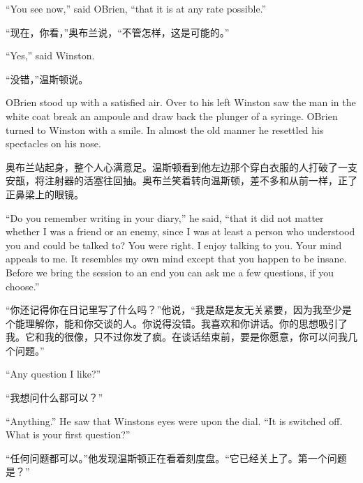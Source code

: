 \begin{paracol}{2}
\switchcolumn*

``You see now,'' said O\textquotesingle Brien, ``that it is at any rate
possible.''

\switchcolumn

``现在，你看，''奥布兰说，``不管怎样，这是可能的。''

\switchcolumn*

``Yes,'' said Winston.

\switchcolumn

``没错，''温斯顿说。

\switchcolumn*

O\textquotesingle Brien stood up with a satisfied air. Over to his left
Winston saw the man in the white coat break an ampoule and draw back the
plunger of a syringe. O\textquotesingle Brien turned to Winston with a
smile. In almost the old manner he resettled his spectacles on his nose.

\switchcolumn

奥布兰站起身，整个人心满意足。温斯顿看到他左边那个穿白衣服的人打破了一支安瓿，将注射器的活塞往回抽。奥布兰笑着转向温斯顿，差不多和从前一样，正了正鼻梁上的眼镜。

\switchcolumn*

``Do you remember writing in your diary,'' he said, ``that it did not
matter whether I was a friend or an enemy, since I was at least a person
who understood you and could be talked to? You were right. I enjoy
talking to you. Your mind appeals to me. It resembles my own mind except
that you happen to be insane. Before we bring the session to an end you
can ask me a few questions, if you choose.''

\switchcolumn

``你还记得你在日记里写了什么吗？''他说，``我是敌是友无关紧要，因为我至少是个能理解你，能和你交谈的人。你说得没错。我喜欢和你讲话。你的思想吸引了我。它和我的很像，只不过你发了疯。在谈话结束前，要是你愿意，你可以问我几个问题。''

\switchcolumn*

``Any question I like?''

\switchcolumn

``我想问什么都可以？''

\switchcolumn*

``Anything.'' He saw that Winston\textquotesingle s eyes were upon the
dial. ``It is switched off. What is your first question?''

\switchcolumn

``任何问题都可以。''他发现温斯顿正在看着刻度盘。``它已经关上了。第一个问题是？''


\end{paracol}
